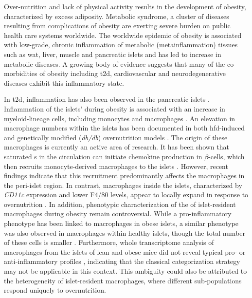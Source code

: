 Over-nutrition and lack of physical activity results in the development of obesity, characterized by excess adiposity. Metabolic syndrome, a cluster of diseases resulting from complications of obesity are exerting severe burden on public health care systems worldwide. The worldwide epidemic of obesity is associated with low-grade, chronic inflammation of metabolic (metainflammation) tissues such as \gls{wat}, liver, muscle and pancreatic islets and has led to increase in metabolic diseases. A growing body of evidence suggests that many of the co-morbidities of obesity including \gls{t2d}, cardiovascular and neurodegenerative diseases exhibit this inflammatory state.\\
\par In \gls{t2d}, inflammation has also been observed in the pancreatic islets \textbf{\cite{boni-schnetzler_islet_2019}}. Inflammation of the islets’ during obesity is associated with an increase in myeloid-lineage cells, including monocytes and macrophages \textbf{\cite{eguchi_islet_2017,ying_role_2019}}. An elevation in macrophage numbers within the islets has been documented in both \gls{hfd}-induced \textbf{\cite{ehses_increased_2007}} and genetically modified (\textit{db/db}) overnutrition models \textbf{\cite{cucak_accumulation_2014}}. The origin of these macrophages is currently an active area of research. It has been shown that saturated s in the circulation can initiate chemokine production in $\beta$-cells, which then recruits monocyte-derived macrophages to the islets \textbf{\cite{eguchi_saturated_2012}}. However, recent findings indicate that this recruitment predominantly affects the macrophages in the peri-islet region. In contrast, macrophages inside the islets, characterized by \textit{CD11c} expression and lower F4/80 levels, appear to locally expand in response to overnutrition \textbf{\cite{ying_expansion_2019}}. In addition, phenotypic characterization of the of islet-resident macrophages during obesity remain controversial. While a pro-inflammatory phenotype has been linked to macrophages in obese islets, a similar phenotype was also observed in macrophages within healthy islets, though the total number of these cells is smaller \textbf{\cite{cucak_accumulation_2014}}. Furthermore, whole transcriptome analysis of macrophages from the islets of lean and obese mice did not reveal typical pro- or anti-inflammatory profiles \textbf{\cite{ying_expansion_2019}}, indicating that the classical categorization strategy may not be applicable in this context. This ambiguity could also be attributed to the heterogeneity of islet-resident macrophages, where different sub-populations respond uniquely to overnutrition.\\
